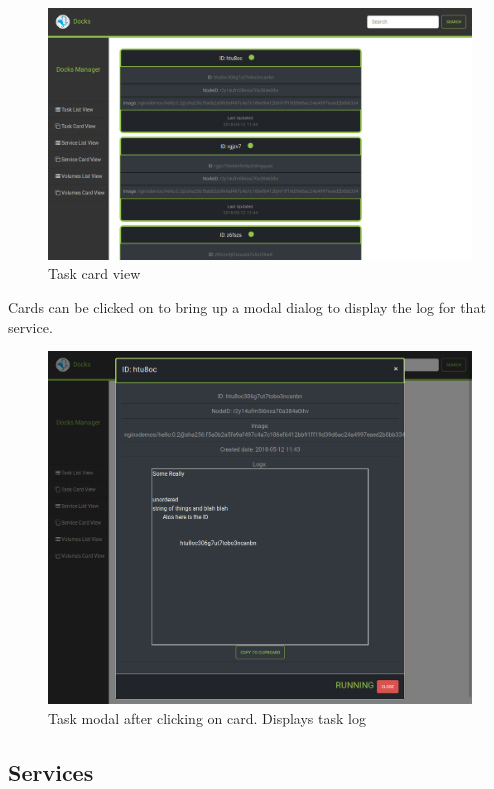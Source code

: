 \documentclass[]{article}
\begin{document}
\begin{figure}[H]
	\centering
	\includegraphics[scale=0.4]{task_card_view.png}
	\caption{Task card view}
\end{figure}

Cards can be clicked on to bring up a modal dialog to display the log for that service.

\begin{figure}[H]
	\centering
	\includegraphics[scale=0.4]{task_card_modal.png}
	\caption{Task modal after clicking on card. Displays task log}
\end{figure}

\subsection{Services}
\end{document}

